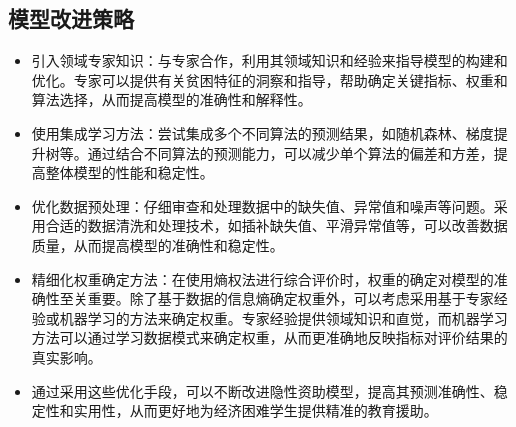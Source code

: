 \documentclass{article}
\begin{document}
\subsection{模型改进策略}
\begin{itemize}
  \item 引入领域专家知识：与专家合作，利用其领域知识和经验来指导模型的构建和优化。专家可以提供有关贫困特征的洞察和指导，帮助确定关键指标、权重和算法选择，从而提高模型的准确性和解释性。
  \item 使用集成学习方法：尝试集成多个不同算法的预测结果，如随机森林、梯度提升树等。通过结合不同算法的预测能力，可以减少单个算法的偏差和方差，提高整体模型的性能和稳定性。
  \item 优化数据预处理：仔细审查和处理数据中的缺失值、异常值和噪声等问题。采用合适的数据清洗和处理技术，如插补缺失值、平滑异常值等，可以改善数据质量，从而提高模型的准确性和稳定性。
  \item 精细化权重确定方法：在使用熵权法进行综合评价时，权重的确定对模型的准确性至关重要。除了基于数据的信息熵确定权重外，可以考虑采用基于专家经验或机器学习的方法来确定权重。专家经验提供领域知识和直觉，而机器学习方法可以通过学习数据模式来确定权重，从而更准确地反映指标对评价结果的真实影响。
  \item 通过采用这些优化手段，可以不断改进隐性资助模型，提高其预测准确性、稳定性和实用性，从而更好地为经济困难学生提供精准的教育援助。
\end{itemize}

\newpage
\end{document}
